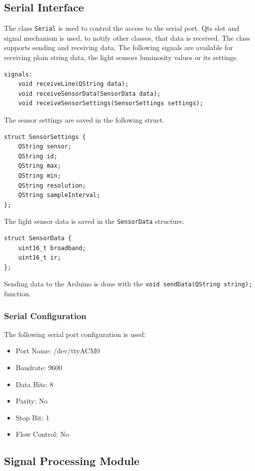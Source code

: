 \documentclass[oneside, notitlepage]{scrreprt}
\begin{document}
\subsection{Serial Interface}
The class \lstinline{Serial} is used to control the access to the serial port. Qts slot and signal mechanism is used, to notify other classes, that data is received. The class supports sending and receiving data. The following signals are available for receiving plain string data, the light sensors luminosity values or its settings.

\begin{lstlisting}
signals:
    void receiveLine(QString data);
    void receiveSensorData(SensorData data);
    void receiveSensorSettings(SensorSettings settings);
\end{lstlisting}

The sensor settings are saved in the following struct.

\begin{lstlisting}
struct SensorSettings {
    QString sensor;
    QString id;
    QString max;
    QString min;
    QString resolution;
    QString sampleInterval;
};
\end{lstlisting}

The light sensor data is saved in the \lstinline{SensorData} structure.

\begin{lstlisting}
struct SensorData {
	uint16_t broadband;
	uint16_t ir;
};
\end{lstlisting}

Sending data to the Arduino is done with the \lstinline{void sendData(QString string);} function.

\subsubsection{Serial Configuration}
The following serial port configuration is used:
\begin{itemize}
	\item{Port Name: /dev/ttyACM0}
	\item{Baudrate: 9600}
	\item{Data Bits: 8}
	\item{Parity: No}
	\item{Stop Bit: 1}
	\item{Flow Control: No}
\end{itemize}

\subsection{Signal Processing Module}
\end{document}
